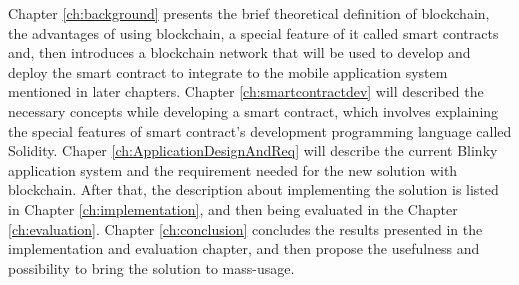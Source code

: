 Chapter \ref{ch:background} presents the brief theoretical definition of blockchain, the advantages of using blockchain, a special feature of it called smart contracts and, then introduces a blockchain network that will be used to develop and deploy the smart contract to integrate to the mobile application system mentioned in later chapters. Chapter \ref{ch:smartcontractdev} will described the necessary concepts while developing a smart contract, which involves explaining the special features of smart contract's development programming language called Solidity. Chaper \ref{ch:ApplicationDesignAndReq} will describe the current Blinky application system and the requirement needed for the new solution with blockchain. After that, the description about implementing the solution is listed in Chapter \ref{ch:implementation}, and then being evaluated in the Chapter \ref{ch:evaluation}. Chapter \ref{ch:conclusion} concludes the results presented in the implementation and evaluation chapter, and then propose the usefulness and possibility to bring the solution to mass-usage.